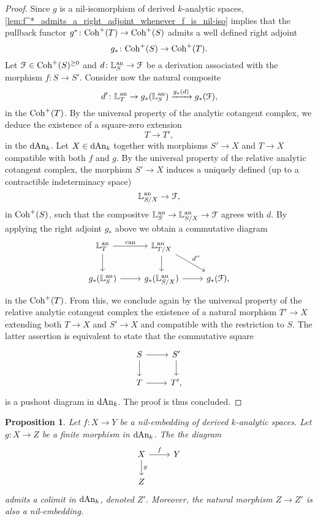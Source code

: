 \documentclass[10pt,a4paper,reqno]{amsart} %
\theoremstyle{plain}
\newtheorem{prop}[thm]{Proposition}
\theoremstyle{definition}
\theoremstyle{remark}
\numberwithin{equation}{section}
\begin{document}
\begin{proof}
    Since $g$ is a nil-isomorphism of derived $k$-analytic spaces, \cref{lem:f^*_admits_a_right_adjoint_whenever_f_is_nil-iso}
    implies that the pullback functor $g^* \colon \mathrm{Coh}^+(T) \to \mathrm{Coh}^+(S)$ admits a well defined right adjoint
        \[
            g_* \colon \mathrm{Coh}^+(S ) \to \mathrm{Coh}^+(T) .
        \]
    Let $\mathcal F \in \mathrm{Coh}^+(S)^{\ge 0}$ and $d \colon \mathbb L^\mathrm{an}_S \to \mathcal F$ be a derivation
    associated with the morphism $f \colon S \to S'$. Consider now the natural composite
        \[
            d ' \colon \mathbb L^\mathrm{an}_T \to g_* (\mathbb L^\mathrm{an}_S) \xrightarrow{g_*(d)} g_* (\mathcal F),  
        \]
    in the \infcat $\mathrm{Coh}^+(T)$. By the universal property of the analytic cotangent complex, we deduce the existence of a square-zero extension
        \[
            T \to T',  
        \]
    in the \infcat $\mathrm{dAn}_k$. Let $X \in \mathrm{dAn}_k$ together with morphisms $S' \to X$ and $T \to X$ compatible with both $f$ and $g$. By the universal property of
    the relative analytic cotangent complex, the morphism $S' \to X$ induces a uniquely defined (up to a contractible indeterminacy space)
        \[
            \mathbb L^\mathrm{an}_{S/X} \to \mathcal F,
        \]
    in $\mathrm{Coh}^+(S)$, such that the compositve $\mathbb L^\mathrm{an}_S \to \mathbb L^\mathrm{an}_{S/X} \to \mathcal F$ agrees with $d$. By applying the right adjoint $g_*$ above we obtain a
    commutative diagram
        \[
        \begin{tikzcd}
            \bbL\an_T \ar{r}{\mathrm{can}} \ar{d} & \bbL\an_{T/X} \ar{d} \ar{rd}{d''} & \\
            g_*(\bbL\an_S) \ar{r} & g_*(\bbL\an_{S/X}) \ar{r} & g_*(\cF),
        \end{tikzcd}
        \]
    in the \infcat $\mathrm{Coh}^+(T)$. From this, we conclude again by the universal property of the relative analytic cotangent complex the existence
    of a natural morphism $T' \to X$ extending both $T \to X$ and $S' \to X$ and compatible with the restriction to $S$. The latter assertion is equivalent to state
    that the commutative square
        \[
        \begin{tikzcd}
            S \ar{r} \ar{d} & S' \ar{d} \\
            T \ar{r} & T',
        \end{tikzcd}
        \]
    is a pushout diagram in $\mathrm{dAn}_k$. The proof is thus concluded.
\end{proof}

\begin{prop} \label{prop:existence_of_pushouts_along_closed_nil-isomorphisms}
    Let $f \colon X \to Y$ be a nil-embedding of derived $k$-analytic spaces. Let
    $g \colon X \to Z$ be a finite morphism in $\mathrm{dAn}_k$. The the diagram
        \[
        \begin{tikzcd}
            X \ar{r}{f} \ar{d}{g} & Y \\
            Z
        \end{tikzcd}  
        \]
    admits a colimit in $\mathrm{dAn}_k$, denoted $Z'$. Moreover, the natural morphism
    $Z \to Z'$ is also a nil-embedding.
\end{prop}
\end{document}
